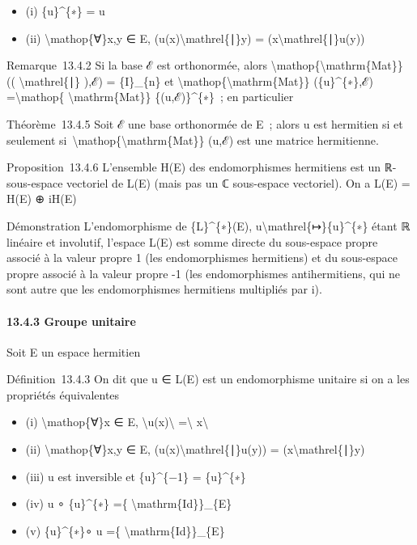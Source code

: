 \documentclass[]{article}
\begin{document}
\begin{itemize}
\itemsep1pt\parskip0pt
\item
  (i) \{u\}\^{}\{∗\} = u
\item
  (ii) \textbackslash{}mathop\{∀\}x,y ∈ E,
  (u(x)\textbackslash{}mathrel\{∣\}y) =
  (x\textbackslash{}mathrel\{∣\}u(y))
\end{itemize}

Remarque~13.4.2 Si la base ℰ est orthonormée, alors
\textbackslash{}mathop\{\textbackslash{}mathrm\{Mat\}\} ((
\textbackslash{}mathrel\{∣\} ),ℰ) = \{I\}\_\{n\} et
\textbackslash{}mathop\{\textbackslash{}mathrm\{Mat\}\}
(\{u\}\^{}\{∗\},ℰ) =\textbackslash{}mathop\{
\textbackslash{}mathrm\{Mat\}\} \{(u,ℰ)\}\^{}\{∗\}~; en particulier

Théorème~13.4.5 Soit ℰ une base orthonormée de E~; alors u est hermitien
si et seulement
si~\textbackslash{}mathop\{\textbackslash{}mathrm\{Mat\}\} (u,ℰ) est une
matrice hermitienne.

Proposition~13.4.6 L'ensemble H(E) des endomorphismes hermitiens est un
ℝ-sous-espace vectoriel de L(E) (mais pas un ℂ sous-espace vectoriel).
On a L(E) = H(E) ⊕ iH(E)

Démonstration L'endomorphisme de \{L\}\^{}\{∗\}(E),
u\textbackslash{}mathrel\{↦\}\{u\}\^{}\{∗\} étant ℝ linéaire et
involutif, l'espace L(E) est somme directe du sous-espace propre associé
à la valeur propre 1 (les endomorphismes hermitiens) et du sous-espace
propre associé à la valeur propre -1 (les endomorphismes antihermitiens,
qui ne sont autre que les endomorphismes hermitiens multipliés par i).

\paragraph{13.4.3 Groupe unitaire}

Soit E un espace hermitien

Définition~13.4.3 On dit que u ∈ L(E) est un endomorphisme unitaire si
on a les propriétés équivalentes

\begin{itemize}
\itemsep1pt\parskip0pt
\item
  (i) \textbackslash{}mathop\{∀\}x ∈ E,
  \textbackslash{}\textbar{}u(x)\textbackslash{}\textbar{}
  =\textbackslash{}\textbar{} x\textbackslash{}\textbar{}
\item
  (ii) \textbackslash{}mathop\{∀\}x,y ∈ E,
  (u(x)\textbackslash{}mathrel\{∣\}u(y)) =
  (x\textbackslash{}mathrel\{∣\}y)
\item
  (iii) u est inversible et \{u\}\^{}\{−1\} = \{u\}\^{}\{∗\}
\item
  (iv) u ∘ \{u\}\^{}\{∗\} =\{ \textbackslash{}mathrm\{Id\}\}\_\{E\}
\item
  (v) \{u\}\^{}\{∗\}∘ u =\{ \textbackslash{}mathrm\{Id\}\}\_\{E\}
\end{itemize}
\end{document}
